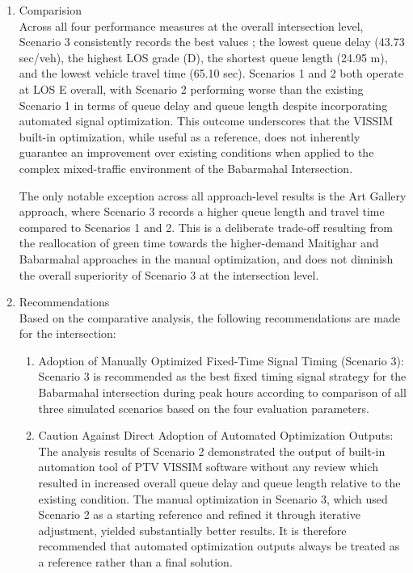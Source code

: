 \begin{enumerate}[label=\alph*.]
\item Comparision \\
Across all four performance measures at the overall intersection level, Scenario 3 consistently records the best values ; the lowest queue delay (43.73 sec/veh), the highest LOS grade (D), the shortest queue length (24.95 m), and the lowest vehicle travel time (65.10 sec). Scenarios 1 and 2 both operate at LOS E overall, with Scenario 2 performing worse than the existing Scenario 1 in terms of queue delay and queue length despite incorporating automated signal optimization. This outcome underscores that the VISSIM built-in optimization, while useful as a reference, does not inherently guarantee an improvement over existing conditions when applied to the complex mixed-traffic environment of the Babarmahal Intersection.

The only notable exception across all approach-level results is the Art Gallery approach, where Scenario 3 records a higher queue length and travel time compared to Scenarios 1 and 2. This is a deliberate trade-off resulting from the reallocation of green time towards the higher-demand Maitighar and Babarmahal approaches in the manual optimization, and does not diminish the overall superiority of Scenario 3 at the intersection level.

\item Recommendations \\
Based on the comparative analysis, the following recommendations are made for the intersection:
\begin{enumerate}[label=\roman*.]
   \item Adoption of Manually Optimized Fixed-Time Signal Timing (Scenario 3): Scenario 3 is recommended as the best fixed timing signal strategy for the Babarmahal intersection during peak hours according to comparison of all three simulated scenarios based on the four evaluation parameters. \\
   \item Caution Against Direct Adoption of Automated Optimization Outputs: The analysis results of Scenario 2 demonstrated the output of built-in automation tool of PTV VISSIM software without any review which resulted in increased overall queue delay and queue length relative to the existing condition. The manual optimization in Scenario 3, which used Scenario 2 as a starting reference and refined it through iterative adjustment, yielded substantially better results. It is therefore recommended that automated optimization outputs always be treated as a reference rather than a final solution. \\
\end{enumerate}
\end{enumerate}

